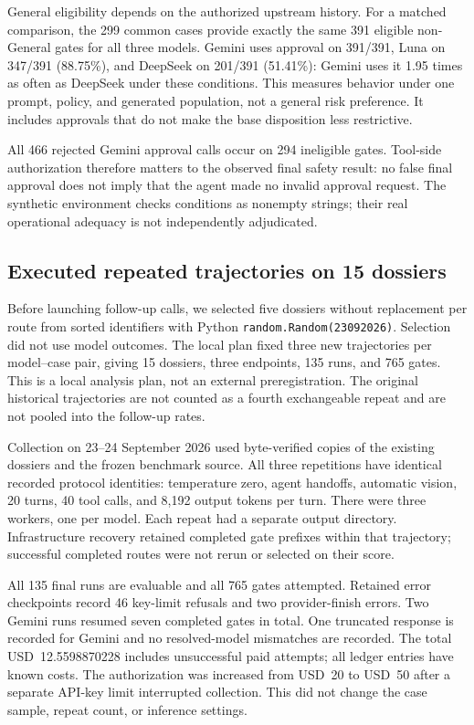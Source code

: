General eligibility depends on the authorized upstream history. For a matched comparison,
the 299 common cases provide exactly the same 391 eligible non-General gates for all three
models. Gemini uses approval on 391/391, Luna on 347/391 (88.75\%), and DeepSeek on 201/391
(51.41\%): Gemini uses it 1.95 times as often as DeepSeek under these conditions. This measures
behavior under one prompt, policy, and generated population, not a general risk preference.
It includes approvals that do not make the base disposition less restrictive.

All 466 rejected Gemini approval calls occur on 294 ineligible gates. Tool-side authorization
therefore matters to the observed final safety result: no false final approval does not imply
that the agent made no invalid approval request. The synthetic environment checks conditions
as nonempty strings; their real operational adequacy is not independently adjudicated.

\subsection{Executed repeated trajectories on 15 dossiers}
\label{sec:repetitions}

Before launching follow-up calls, we selected five dossiers without replacement per route
from sorted identifiers with Python \texttt{random.Random(23092026)}. Selection did not use
model outcomes. The local plan fixed three new trajectories per model--case pair, giving
15 dossiers, three endpoints, 135 runs, and 765 gates. This is a local analysis plan, not an
external preregistration. The original historical trajectories are not counted as a fourth
exchangeable repeat and are not pooled into the follow-up rates.

Collection on 23--24 September 2026 used byte-verified copies of the existing dossiers and the
frozen benchmark source. All three repetitions have identical recorded protocol identities:
temperature zero, agent handoffs, automatic vision, 20 turns, 40 tool calls, and 8,192 output
tokens per turn. There were three workers, one per model. Each repeat had a separate output
directory. Infrastructure recovery retained completed gate prefixes within that trajectory;
successful completed routes were not rerun or selected on their score.

All 135 final runs are evaluable and all 765 gates attempted. Retained error checkpoints
record 46 key-limit refusals and two provider-finish errors. Two Gemini runs resumed seven
completed gates in total. One truncated response is recorded for Gemini and no resolved-model
mismatches are recorded. The total USD~12.5598870228 includes unsuccessful paid attempts;
all ledger entries have known costs. The authorization was increased from USD~20 to USD~50
after a separate API-key limit interrupted collection. This did not change the case sample,
repeat count, or inference settings.

